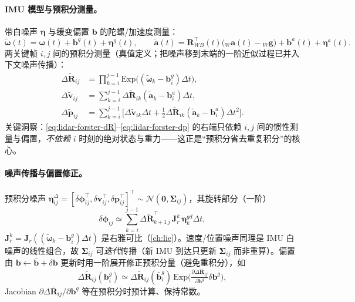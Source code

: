 \paragraph{IMU 模型与预积分测量。}
带白噪声 $\boldsymbol{\eta}$ 与缓变偏置 $\mathbf{b}$ 的陀螺/加速度测量\cite{forster2017preintegration}：
\begin{equation}
  \tilde{\boldsymbol{\omega}}(t)=\boldsymbol{\omega}(t)+\mathbf{b}^g(t)+\boldsymbol{\eta}^g(t),\qquad
  \tilde{\mathbf{a}}(t)=\mathbf{R}_{WB}^\top(t)\big({}_W\mathbf{a}(t)-{}_W\mathbf{g}\big)+\mathbf{b}^a(t)+\boldsymbol{\eta}^a(t).
  \label{eq:lidar-forster-imu}
\end{equation}
两关键帧 $i,j$ 间的预积分测量（真值定义；把噪声移到末端的一阶近似过程已并入下文噪声传播）：
\begin{align}
  \Delta\tilde{\mathbf{R}}_{ij}&=\prod_{k=i}^{j-1}\mathrm{Exp}\big((\tilde{\boldsymbol{\omega}}_k-\mathbf{b}^g_i)\Delta t\big), \label{eq:lidar-forster-dR}\\
  \Delta\tilde{\mathbf{v}}_{ij}&=\sum_{k=i}^{j-1}\Delta\tilde{\mathbf{R}}_{ik}(\tilde{\mathbf{a}}_k-\mathbf{b}^a_i)\Delta t, \label{eq:lidar-forster-dv}\\
  \Delta\tilde{\mathbf{p}}_{ij}&=\sum_{k=i}^{j-1}\Big[\Delta\tilde{\mathbf{v}}_{ik}\Delta t+\tfrac12\Delta\tilde{\mathbf{R}}_{ik}(\tilde{\mathbf{a}}_k-\mathbf{b}^a_i)\Delta t^2\Big]. \label{eq:lidar-forster-dp}
\end{align}
关键洞察：\cref{eq:lidar-forster-dR}–\cref{eq:lidar-forster-dp} 的右端只依赖 $i,j$ 间的惯性测量与偏置，\emph{不依赖} $i$ 时刻的绝对状态与重力——这正是“预积分省去重复积分”的核心。

\paragraph{噪声传播与偏置修正。}
预积分噪声 $\boldsymbol{\eta}^\Delta_{ij}=[\delta\boldsymbol{\phi}_{ij}^\top,\delta\mathbf{v}_{ij}^\top,\delta\mathbf{p}_{ij}^\top]^\top\sim\mathcal{N}(\mathbf{0},\boldsymbol{\Sigma}_{ij})$，其旋转部分（一阶）
\begin{equation}
  \delta\boldsymbol{\phi}_{ij}\simeq\sum_{k=i}^{j-1}\Delta\tilde{\mathbf{R}}_{k+1\,j}^\top\,\mathbf{J}_r^k\,\boldsymbol{\eta}^{gd}_k\Delta t,
  \label{eq:lidar-forster-noise}
\end{equation}
$\mathbf{J}_r^k=\mathbf{J}_r((\tilde{\boldsymbol{\omega}}_k-\mathbf{b}^g_i)\Delta t)$ 是右雅可比（\cref{ch:lie}）。速度/位置噪声同理是 IMU 白噪声的线性组合，故 $\boldsymbol{\Sigma}_{ij}$ 可\emph{迭代}传播（新 IMU 到达只更新 $\boldsymbol{\Sigma}_{ij}$ 而非重算）。偏置由 $\mathbf{b}\leftarrow\bar{\mathbf{b}}+\delta\mathbf{b}$ 更新时用一阶展开修正预积分量（避免重积分），如
\begin{equation}
  \Delta\tilde{\mathbf{R}}_{ij}(\mathbf{b}^g_i)\simeq\Delta\tilde{\mathbf{R}}_{ij}(\bar{\mathbf{b}}^g_i)\,\mathrm{Exp}\Big(\tfrac{\partial\Delta\bar{\mathbf{R}}_{ij}}{\partial\mathbf{b}^g}\delta\mathbf{b}^g\Big),
  \label{eq:lidar-forster-bias}
\end{equation}
Jacobian $\partial\Delta\bar{\mathbf{R}}_{ij}/\partial\mathbf{b}^g$ 等在预积分时预计算、保持常数。

